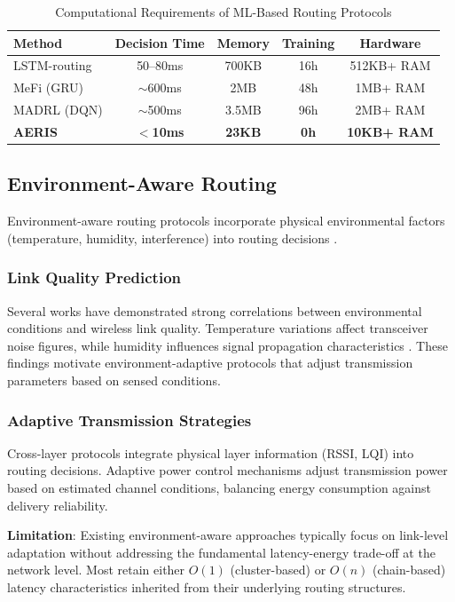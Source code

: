 \begin{table}[htbp]
\centering
\caption{Computational Requirements of ML-Based Routing Protocols}
\label{tab:ml_comparison}
\begin{tabular}{@{}lcccc@{}}
\toprule
Method & Decision Time & Memory & Training & Hardware \\
\midrule
LSTM-routing & 50--80ms & 700KB & 16h & 512KB+ RAM \\
MeFi (GRU) & $\sim$600ms & 2MB & 48h & 1MB+ RAM \\
MADRL (DQN) & $\sim$500ms & 3.5MB & 96h & 2MB+ RAM \\
\textbf{AERIS} & $<$\textbf{10ms} & \textbf{23KB} & \textbf{0h} & \textbf{10KB+ RAM} \\
\bottomrule
\end{tabular}
\end{table}

\subsection{Environment-Aware Routing}

Environment-aware routing protocols incorporate physical environmental
factors (temperature, humidity, interference) into routing decisions
\cite{sun2021environment, wang2022adaptive}.

\subsubsection{Link Quality Prediction}

Several works have demonstrated strong correlations between environmental
conditions and wireless link quality. Temperature variations affect
transceiver noise figures, while humidity influences signal propagation
characteristics \cite{boano2010impact}. These findings motivate
environment-adaptive protocols that adjust transmission parameters based
on sensed conditions.

\subsubsection{Adaptive Transmission Strategies}

Cross-layer protocols integrate physical layer information (RSSI, LQI)
into routing decisions. Adaptive power control mechanisms adjust
transmission power based on estimated channel conditions, balancing
energy consumption against delivery reliability.

\textbf{Limitation}: Existing environment-aware approaches typically
focus on link-level adaptation without addressing the fundamental
latency-energy trade-off at the network level. Most retain either
$O(1)$ (cluster-based) or $O(n)$ (chain-based) latency characteristics
inherited from their underlying routing structures.

